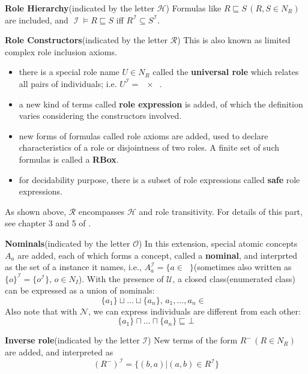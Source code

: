 \documentclass{article}
\DeclareMathOperator{\deno}{\mathcal{I}}
\DeclareMathOperator{\dm}{\Delta^{\deno}}
\begin{document}
\textbf{Role Hierarchy}(indicated by the letter $\mathcal{H}$)\newline
Formulas like $R \sqsubseteq S\,(R,S \in N_R)$ are included, and $\deno \vDash R \sqsubseteq S$ iff $R^{\deno} \subseteq S^{\deno}$.\newline

\textbf{Role Constructors}(indicated by the letter $\mathcal{R}$)\newline
This is also known as limited complex role inclusion axioms. 
\begin{itemize}
\item there is a special role name $U \in N_R$ called the \textbf{universal role} which relates all pairs of individuals; i.e. $U^{\deno} = \dm \times \dm$.
\item a new kind of terms called \textbf{role expression} is added, of which the definition varies considering the constructors involved. 
\item new forms of formulas called role axioms are added, used to declare characteristics of a role or disjointness of two roles. A finite set of such formulas is called a \textbf{RBox}. 
\item for decidability purpose, there is a subset of role expressions called \textbf{safe} role expressions.
\end{itemize}
As shown above, $\mathcal{R}$ encompasses $\mathcal{H}$ and role transitivity. For details of this part, see chapter 3 and 5 of \cite{rbox}.\newline

\textbf{Nominals}(indicated by the letter $\mathcal{O}$)\newline
In this extension, special atomic concepts $A_a$ are added, each of which forms a concept, called a \textbf{nominal}, and interprted as the set of a instance it names, i.e., $A_a^{\deno} = \{a \in \dm\}$(sometimes also written as $\{o\}^{\deno} = \{o^{\deno}\},\,o \in N_I$). With the presence of $\mathcal{U}$, a closed class(enumerated class) can be expressed as a union of nominals:
\[
\{a_1\} \sqcup \dots \sqcup \{a_n\},\,a_1,\dots,a_n \in \dm
\]
Also note that with $\mathcal{N}$, we can express individuals are different from each other:\[
\{a_1\} \sqcap \dots \sqcap \{a_n\} \sqsubseteq \bot
\]

\textbf{Inverse role}(indicated by the letter ${\mathcal{I}}$)\newline
New terms of the form $R^{-}\,(R \in N_R)$ are added, and interpreted as 
\[
(R^{-})^{\deno} = \{(b,a) | (a,b) \in R^{\deno}\}
\]
\end{document}
